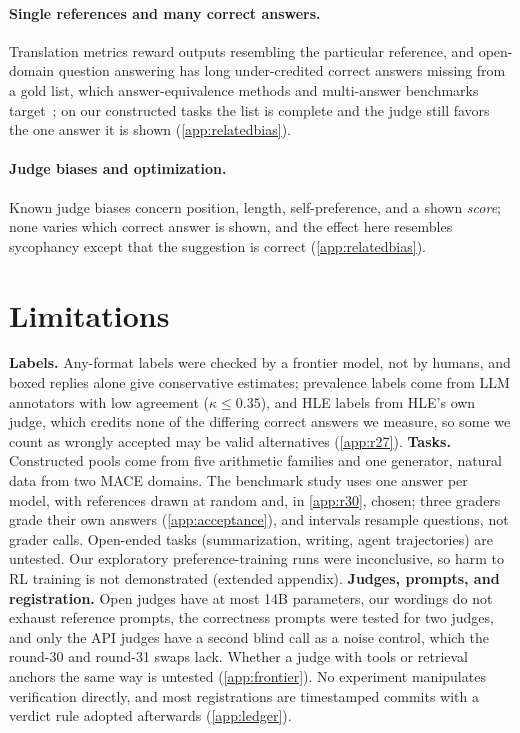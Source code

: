 \documentclass{article}
\begin{document}
\paragraph{Single references and many correct answers.}
Translation metrics reward outputs resembling the particular reference, and open-domain question answering has long under-credited correct answers missing from a gold list, which answer-equivalence methods and multi-answer benchmarks target~\citep{min2020ambigqa,kamalloo2023evaluating,amouyal2022qampari,li2024pedants}; on our constructed tasks the list is complete and the judge still favors the one answer it is shown (\cref{app:relatedbias}).

\paragraph{Judge biases and optimization.}
Known judge biases concern position, length, self-preference, and a shown \emph{score}; none varies which correct answer is shown, and the effect here resembles sycophancy except that the suggestion is correct (\cref{app:relatedbias}).

\section{Limitations}
\label{sec:limits}

\textbf{Labels.} Any-format labels were checked by a frontier model, not by humans, and boxed replies alone give conservative estimates; prevalence labels come from LLM annotators with low agreement ($\kappa \le 0.35$), and HLE labels from HLE's own judge, which credits none of the differing correct answers we measure, so some we count as wrongly accepted may be valid alternatives (\cref{app:r27}).
\textbf{Tasks.} Constructed pools come from five arithmetic families and one generator, natural data from two \textsc{MACE} domains. The benchmark study uses one answer per model, with references drawn at random and, in \cref{app:r30}, chosen; three graders grade their own answers (\cref{app:acceptance}), and intervals resample questions, not grader calls. Open-ended tasks (summarization, writing, agent trajectories) are untested. Our exploratory preference-training runs were inconclusive, so harm to RL training is not demonstrated (extended appendix).
\textbf{Judges, prompts, and registration.} Open judges have at most 14B parameters, our wordings do not exhaust reference prompts, the correctness prompts were tested for two judges, and only the API judges have a second blind call as a noise control, which the round-30 and round-31 swaps lack. Whether a judge with tools or retrieval anchors the same way is untested (\cref{app:frontier}). No experiment manipulates verification directly, and most registrations are timestamped commits with a verdict rule adopted afterwards (\cref{app:ledger}).
\end{document}
